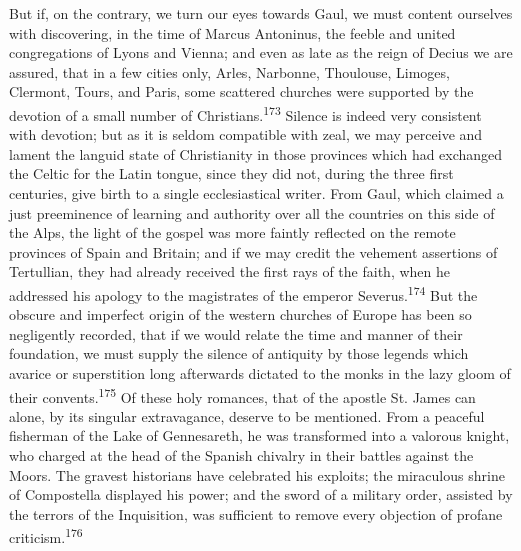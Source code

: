 But if, on the contrary, we turn our eyes towards Gaul, we must
content ourselves with discovering, in the time of Marcus
Antoninus, the feeble and united congregations of Lyons and
Vienna; and even as late as the reign of Decius we are assured,
that in a few cities only, Arles, Narbonne, Thoulouse, Limoges,
Clermont, Tours, and Paris, some scattered churches were
supported by the devotion of a small number of Christians.\textsuperscript{173}
Silence is indeed very consistent with devotion; but as it is
seldom compatible with zeal, we may perceive and lament the
languid state of Christianity in those provinces which had
exchanged the Celtic for the Latin tongue, since they did not,
during the three first centuries, give birth to a single
ecclesiastical writer. From Gaul, which claimed a just
preeminence of learning and authority over all the countries on
this side of the Alps, the light of the gospel was more faintly
reflected on the remote provinces of Spain and Britain; and if we
may credit the vehement assertions of Tertullian, they had
already received the first rays of the faith, when he addressed
his apology to the magistrates of the emperor Severus.\textsuperscript{174} But
the obscure and imperfect origin of the western churches of
Europe has been so negligently recorded, that if we would relate
the time and manner of their foundation, we must supply the
silence of antiquity by those legends which avarice or
superstition long afterwards dictated to the monks in the lazy
gloom of their convents.\textsuperscript{175} Of these holy romances, that of the
apostle St. James can alone, by its singular extravagance,
deserve to be mentioned. From a peaceful fisherman of the Lake of
Gennesareth, he was transformed into a valorous knight, who
charged at the head of the Spanish chivalry in their battles
against the Moors. The gravest historians have celebrated his
exploits; the miraculous shrine of Compostella displayed his
power; and the sword of a military order, assisted by the terrors
of the Inquisition, was sufficient to remove every objection of
profane criticism.\textsuperscript{176}



